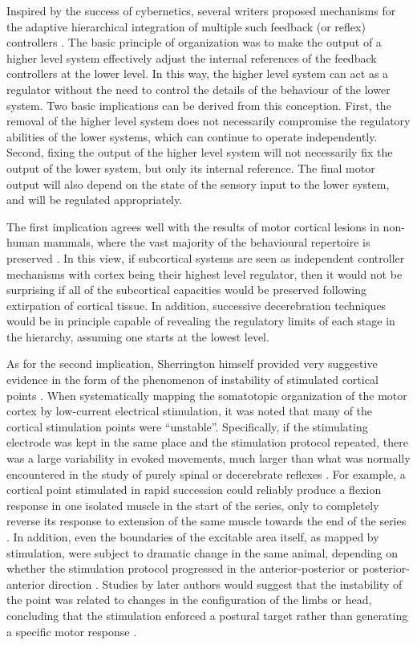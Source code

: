 Inspired by the success of cybernetics, several writers proposed mechanisms for the adaptive hierarchical integration of multiple such feedback (or reflex) controllers \cite{Powers1973}. The basic principle of organization was to make the output of a higher level system effectively adjust the internal references of the feedback controllers at the lower level. In this way, the higher level system can act as a regulator without the need to control the details of the behaviour of the lower system. Two basic implications can be derived from this conception. First, the removal of the higher level system does not necessarily compromise the regulatory abilities of the lower systems, which can continue to operate independently. Second, fixing the output of the higher level system will not necessarily fix the output of the lower system, but only its internal reference. The final motor output will also depend on the state of the sensory input to the lower system, and will be regulated appropriately.

The first implication agrees well with the results of motor cortical lesions in non-human mammals, where the vast majority of the behavioural repertoire is preserved \cite{Goltz1888,Grunbaum1903,GrahamBrown1913,Leyton1917,Bjursten1976,Terry1989,Whishaw1991,Darling2011,Zaaimi2012,Kawai2015}. In this view, if subcortical systems are seen as independent controller mechanisms with cortex being their highest level regulator, then it would not be surprising if all of the subcortical capacities would be preserved following extirpation of cortical tissue. In addition, successive decerebration techniques would be in principle capable of revealing the regulatory limits of each stage in the hierarchy, assuming one starts at the lowest level.

As for the second implication, Sherrington himself provided very suggestive evidence in the form of the phenomenon of instability of stimulated cortical points \cite{GrahamBrown1912,Leyton1917}. When systematically mapping the somatotopic organization of the motor cortex by low-current electrical stimulation, it was noted that many of the cortical stimulation points were ``unstable''. Specifically, if the stimulating electrode was kept in the same place and the stimulation protocol repeated, there was a large variability in evoked movements, much larger than what was normally encountered in the study of purely spinal or decerebrate reflexes \cite{GrahamBrown1912}. For example, a cortical point stimulated in rapid succession could reliably produce a flexion response in one isolated muscle in the start of the series, only to completely reverse its response to extension of the same muscle towards the end of the series \cite{GrahamBrown1912}. In addition, even the boundaries of the excitable area itself, as mapped by stimulation, were subject to dramatic change in the same animal, depending on whether the stimulation protocol progressed in the anterior-posterior or posterior-anterior direction \cite{Leyton1917}. Studies by later authors would suggest that the instability of the point was related to changes in the configuration of the limbs or head, concluding that the stimulation enforced a postural target rather than generating a specific motor response \cite{Ward1938}.

